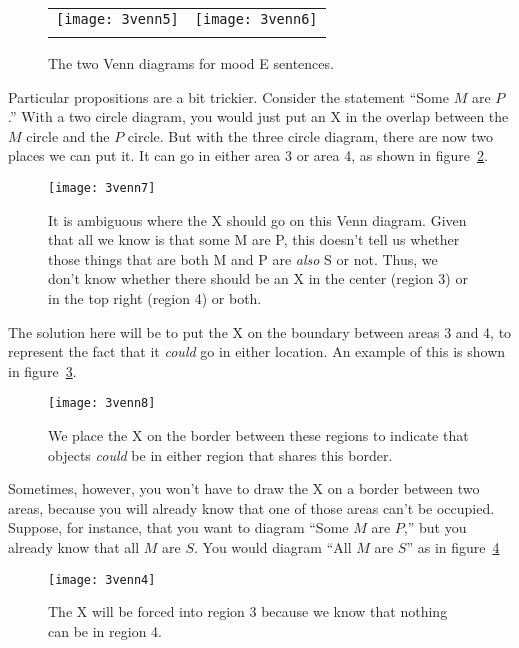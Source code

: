 \begin{figure}
\begin{tabu}{X[1,c] X[1,c]}
\texttt{[image: 3venn5]} &
\texttt{[image: 3venn6]} \\
\caption{The two Venn diagrams for mood E sentences.}
\label{fig:mood-E_venns}
\end{tabu}
\end{figure}

Particular propositions are a bit trickier. Consider the statement ``Some $M$ are $P$.'' With a two circle diagram, you would just put an X in the overlap between the $M$ circle and the $P$ circle. But with the three circle diagram, there are now two places we can put it. It can go in either area 3 or area 4, as shown in figure~\ref{fig:vennambig}.

\begin{figure}[!ht]\centering
\texttt{[image: 3venn7]}
\caption{It is ambiguous where the X should go on this Venn diagram. Given that all we know is that some M are P, this doesn't tell us whether those things that are both M and P are \emph{also} S or not. Thus, we don't know whether there should be an X in the center (region 3) or in the top right (region 4) or both. }
\label{fig:vennambig}
\end{figure}

The solution here will be to put the X on the boundary between areas 3 and 4, to represent the fact that it \emph{could} go in either location. An example of this is shown in figure~\ref{fig:vennunambig}.

\begin{figure}[!ht]\centering
\texttt{[image: 3venn8]}
\caption{We place the X on the border between these regions to indicate that objects \emph{could} be in either region that shares this border.}
\label{fig:vennunambig}
\end{figure}

Sometimes, however, you won't have to draw the X on a border between two areas, because you will already know that one of those areas can't be occupied. Suppose, for instance, that you want to diagram ``Some $M$ are $P$,'' but you already know that all $M$ are $S$. You would diagram ``All $M$ are $S$'' as in figure~\ref{fig:vennunivex}

\begin{figure}[!ht]\centering
\texttt{[image: 3venn4]}
\caption{The X will be forced into region 3 because we know that nothing can be in region 4.}
\label{fig:vennunivex}
\end{figure}

